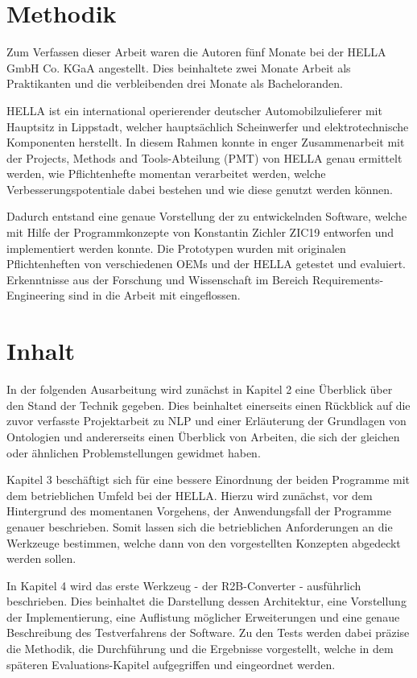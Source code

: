 \documentclass[12pt]{report}
\begin{document}
\section{Methodik}
Zum Verfassen dieser Arbeit waren die Autoren fünf Monate bei der HELLA GmbH  Co. KGaA angestellt. Dies beinhaltete zwei Monate Arbeit als Praktikanten und die verbleibenden drei Monate als Bacheloranden. 

HELLA ist ein international operierender deutscher Automobilzulieferer mit Hauptsitz in Lippstadt, welcher hauptsächlich Scheinwerfer und elektrotechnische Komponenten herstellt.
In diesem Rahmen konnte in enger Zusammenarbeit mit der Projects, Methods and Tools-Abteilung (PMT) von HELLA genau ermittelt werden, wie Pflichtenhefte momentan verarbeitet werden, welche Verbesserungspotentiale dabei bestehen und wie diese genutzt werden können. 

Dadurch entstand eine genaue Vorstellung der zu entwickelnden Software, welche mit Hilfe der Programmkonzepte von Konstantin Zichler ZIC19 entworfen und implementiert werden konnte. Die Prototypen wurden mit originalen Pflichtenheften von verschiedenen OEMs und der HELLA getestet und evaluiert. Erkenntnisse aus der Forschung und Wissenschaft im Bereich Requirements-Engineering sind in die Arbeit mit eingeflossen.

\section{Inhalt}
In der folgenden Ausarbeitung wird zunächst in Kapitel 2 eine Überblick über den Stand der Technik gegeben. Dies beinhaltet einerseits einen Rückblick auf die zuvor verfasste Projektarbeit zu NLP und einer Erläuterung der Grundlagen von Ontologien und andererseits einen Überblick von Arbeiten, die sich der gleichen oder ähnlichen Problemstellungen gewidmet haben. 

Kapitel 3 beschäftigt sich für eine bessere Einordnung der beiden Programme mit dem betrieblichen Umfeld bei der HELLA. Hierzu wird zunächst, vor dem Hintergrund des momentanen Vorgehens, der Anwendungsfall der Programme genauer beschrieben. Somit lassen sich die betrieblichen Anforderungen an die Werkzeuge bestimmen, welche dann von den vorgestellten Konzepten abgedeckt werden sollen. 

In Kapitel 4 wird das erste Werkzeug - der R2B-Converter - ausführlich beschrieben. Dies beinhaltet die Darstellung dessen Architektur, eine Vorstellung der Implementierung, eine Auflistung möglicher Erweiterungen und eine genaue Beschreibung des Testverfahrens der Software. Zu den Tests werden dabei präzise die Methodik, die Durchführung und die Ergebnisse vorgestellt, welche in dem späteren Evaluations-Kapitel aufgegriffen und eingeordnet werden. 
\end{document}

